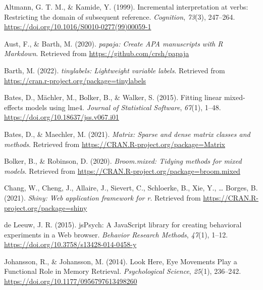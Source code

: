 \documentclass[
  man,floatsintext]{apa6}
\newlength{\cslhangindent}
\newlength{\cslentryspacingunit} %
\newenvironment{CSLReferences}[2] %
 {%
  \setlength{\parindent}{0pt}
  \ifodd #1
  \let\oldpar\par
  \def\par{\hangindent=\cslhangindent\oldpar}
  \fi
  \setlength{\parskip}{#2\cslentryspacingunit}
 }%
 {}
\begin{document}
\hypertarget{refs}{}
\begin{CSLReferences}{1}{0}
\leavevmode{}%
Altmann, G. T. M., \& Kamide, Y. (1999). Incremental interpretation at verbs: Restricting the domain of subsequent reference. \emph{Cognition}, \emph{73}(3), 247--264. \url{https://doi.org/10.1016/S0010-0277(99)00059-1}

\leavevmode{}%
Aust, F., \& Barth, M. (2020). \emph{{papaja}: {Create} {APA} manuscripts with {R Markdown}}. Retrieved from \url{https://github.com/crsh/papaja}

\leavevmode{}%
Barth, M. (2022). \emph{{tinylabels}: Lightweight variable labels}. Retrieved from \url{https://cran.r-project.org/package=tinylabels}

\leavevmode{}%
Bates, D., Mächler, M., Bolker, B., \& Walker, S. (2015). Fitting linear mixed-effects models using {lme4}. \emph{Journal of Statistical Software}, \emph{67}(1), 1--48. \url{https://doi.org/10.18637/jss.v067.i01}

\leavevmode{}%
Bates, D., \& Maechler, M. (2021). \emph{Matrix: Sparse and dense matrix classes and methods}. Retrieved from \url{https://CRAN.R-project.org/package=Matrix}

\leavevmode{}%
Bolker, B., \& Robinson, D. (2020). \emph{Broom.mixed: Tidying methods for mixed models}. Retrieved from \url{https://CRAN.R-project.org/package=broom.mixed}

\leavevmode{}%
Chang, W., Cheng, J., Allaire, J., Sievert, C., Schloerke, B., Xie, Y., \ldots{} Borges, B. (2021). \emph{Shiny: Web application framework for r}. Retrieved from \url{https://CRAN.R-project.org/package=shiny}

\leavevmode{}%
de Leeuw, J. R. (2015). {jsPsych}: {A JavaScript} library for creating behavioral experiments in a {Web} browser. \emph{Behavior Research Methods}, \emph{47}(1), 1--12. \url{https://doi.org/10.3758/s13428-014-0458-y}

\leavevmode{}%
Johansson, R., \& Johansson, M. (2014). Look {Here}, {Eye Movements Play} a {Functional Role} in {Memory Retrieval}. \emph{Psychological Science}, \emph{25}(1), 236--242. \url{https://doi.org/10.1177/0956797613498260}


\end{CSLReferences}
\end{document}
